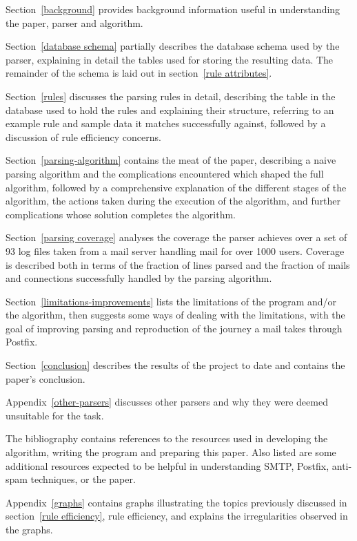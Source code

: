 \documentclass[a4paper,12pt,draft]{article}
\begin{document}
Section~\ref{background} provides background information useful in
understanding the paper, parser and algorithm.

Section~\ref{database schema} partially describes the database schema used
by the parser, explaining in detail the tables used for storing the
resulting data.  The remainder of the schema is laid out in
section~\ref{rule attributes}.

Section~\ref{rules} discusses the parsing rules in detail, describing the
table in the database used to hold the rules and explaining their
structure, referring to an example rule and sample data it matches
successfully against, followed by a discussion of rule efficiency concerns.

Section~\ref{parsing-algorithm} contains the meat of the paper, describing
a naive parsing algorithm and the complications encountered which shaped
the full algorithm, followed by a comprehensive explanation of the
different stages of the algorithm, the actions taken during the execution
of the algorithm, and further complications whose solution completes the
algorithm.

Section~\ref{parsing coverage} analyses the coverage the parser achieves
over a set of 93 log files taken from a mail server handling mail for over
1000 users.  Coverage is described both in terms of the fraction of lines
parsed and the fraction of mails and connections successfully handled by
the parsing algorithm.

Section~\ref{limitations-improvements} lists the limitations of the program
and/or the algorithm, then suggests some ways of dealing with the
limitations, with the goal of improving parsing and reproduction of the
journey a mail takes through Postfix.

Section~\ref{conclusion} describes the results of the project to date and
contains the paper's conclusion.

Appendix~\ref{other-parsers} discusses other parsers and why they were
deemed unsuitable for the task.

The bibliography contains references to the resources used in developing
the algorithm, writing the program and preparing this paper.  Also listed
are some additional resources expected to be helpful in understanding SMTP,
Postfix, anti-spam techniques, or the paper.

Appendix~\ref{graphs} contains graphs illustrating the topics previously
discussed in section~\ref{rule efficiency}, rule efficiency, and explains
the irregularities observed in the graphs.
\end{document}
